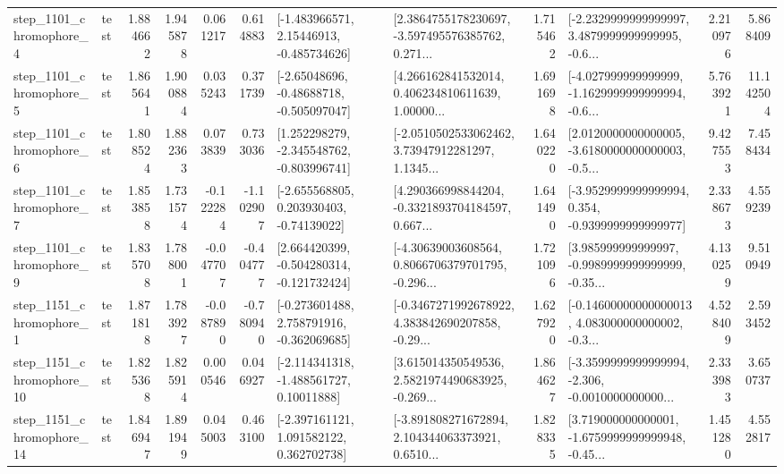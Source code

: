 \begin{tabular}{llrrrrllrlrr}
  step\_1101\_chromophore\_4 &      test &      1.884662 &    1.945878 &      0.061217 &  0.614883 &    [-1.483966571, 2.15446913, -0.485734626] &  [2.3864755178230697, -3.597495576385762, 0.271... &       1.715462 &  [-2.2329999999999997, 3.4879999999999995, -0.6... &            2.210976 &          5.868409 \\
  step\_1101\_chromophore\_5 &      test &      1.865641 &    1.900884 &      0.035243 &  0.371739 &    [-2.65048696, -0.48688718, -0.505097047] &  [4.266162841532014, 0.406234810611639, 1.00000... &       1.691698 &  [-4.027999999999999, -1.1629999999999994, -0.6... &            5.763921 &         11.142504 \\
  step\_1101\_chromophore\_6 &      test &      1.808524 &    1.882363 &      0.073839 &  0.733036 &   [1.252298279, -2.345548762, -0.803996741] &  [-2.0510502533062462, 3.73947912281297, 1.1345... &       1.640220 &  [2.0120000000000005, -3.6180000000000003, -0.5... &            9.427553 &          7.458434 \\
  step\_1101\_chromophore\_7 &      test &      1.853858 &    1.731574 &     -0.122284 & -1.102907 &    [-2.655568805, 0.203930403, -0.74139022] &  [4.290366998844204, -0.3321893704184597, 0.667... &       1.641490 &  [-3.9529999999999994, 0.354, -0.9399999999999977] &            2.338673 &          4.559239 \\
  step\_1101\_chromophore\_9 &      test &      1.835708 &    1.788001 &     -0.047707 & -0.404777 &   [2.664420399, -0.504280314, -0.121732424] &  [-4.30639003608564, 0.8066706379701795, -0.296... &       1.721096 &  [3.985999999999997, -0.9989999999999999, -0.35... &            4.130259 &          9.510949 \\
  step\_1151\_chromophore\_1 &      test &      1.871818 &    1.783927 &     -0.087890 & -0.780940 &   [-0.273601488, 2.758791916, -0.362069685] &  [-0.3467271992678922, 4.383842690207858, -0.29... &       1.627920 &  [-0.14600000000000013, 4.083000000000002, -0.3... &            4.528409 &          2.593452 \\
 step\_1151\_chromophore\_10 &      test &      1.825368 &    1.825914 &      0.000546 &  0.046927 &    [-2.114341318, -1.488561727, 0.10011888] &  [3.615014350549536, 2.5821974490683925, -0.269... &       1.864627 &  [-3.3599999999999994, -2.306, -0.0010000000000... &            2.333983 &          3.650737 \\
 step\_1151\_chromophore\_14 &      test &      1.846947 &    1.891949 &      0.045003 &  0.463100 &    [-2.397161121, 1.091582122, 0.362702738] &  [-3.891808271672894, 2.104344063373921, 0.6510... &       1.828335 &  [3.719000000000001, -1.6759999999999948, -0.45... &            1.451280 &          4.552817 \\

\end{tabular}
